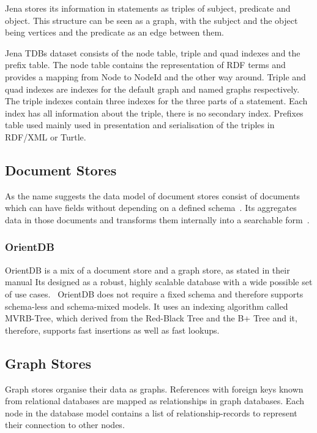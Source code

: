 Jena stores its information in statements as triples of subject, predicate and object.
This structure can be seen as a graph, with the subject and the object being vertices and the predicate as an edge between them.

Jena TDBs dataset consists of the node table, triple and quad indexes and the prefix table.
The node table contains the representation of RDF terms and provides a mapping from Node to NodeId and the other way around.
Triple and quad indexes are indexes for the default graph and named graphs respectively.
The triple indexes contain three indexes for the three parts of a statement.
Each index has all information about the triple,
there is no secondary index.
Prefixes table used mainly used in presentation and serialisation of the triples in RDF/XML or Turtle.~\cite{ApacheTDB}

\subsection{Document Stores}
As the name suggests the data model of document stores consist of documents which can have fields without depending on a defined schema~\cite{OrientDB}.
Its aggregates data in those documents and transforms them internally into a searchable form~\cite{Techopedia2017}.

\subsubsection{OrientDB}
OrientDB is a mix of a document store and a graph store,
as stated in their manual 
Its designed as a robust, highly scalable database with a wide possible set of use cases.~\cite{OrientDB}
OrientDB does not require a fixed schema and therefore supports schema-less and schema-mixed models.
It uses an indexing algorithm called MVRB-Tree,
which derived from the Red-Black Tree and the B+ Tree and it,
therefore,
supports fast insertions as well as fast lookups.~\cite{Abubakar2014}

\subsection{Graph Stores}
\label{ch:background:se:graphStores}
Graph stores organise their data as graphs.
References with foreign keys known from relational databases are mapped as relationships in graph databases.
Each node in the database model contains a list of relationship-records to represent their connection to other nodes.~\cite{NeoTechnologyInc.2016}

